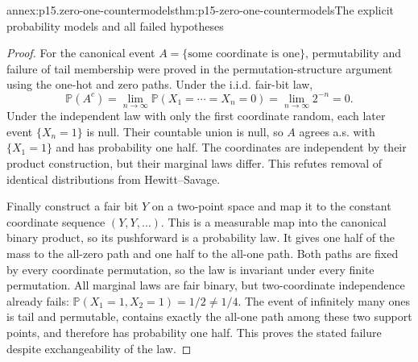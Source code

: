 \begin{annexitem}{annex:p15.zero-one-countermodels}{thm:p15-zero-one-countermodels}{The explicit probability models and all failed hypotheses}
\begin{proof}
For the canonical event \(A=\{\text{some coordinate is one}\}\),
permutability and failure of tail membership were proved in
the permutation-structure argument using the one-hot and zero
paths. Under the i.i.d. fair-bit law,
\[
 \mathbb P(A^c)=\lim_{n\to\infty}
      \mathbb P(X_1=\cdots=X_n=0)=\lim_{n\to\infty}2^{-n}=0.
\]
Under the independent law with only the first coordinate random,
each later event \(\{X_n=1\}\) is null. Their countable
union is null, so \(A\) agrees a.s. with \(\{X_1=1\}\)
and has probability one half. The coordinates are independent
by their product construction, but their marginal laws differ.
This refutes removal of identical distributions from Hewitt--Savage.

Finally construct a fair bit \(Y\) on a two-point space and
map it to the constant coordinate sequence \((Y,Y,\ldots)\).
This is a measurable map into the canonical binary product,
so its pushforward is a probability law. It gives one half
of the mass to the all-zero path and one half to the all-one
path. Both paths are fixed by every coordinate permutation,
so the law is invariant under every finite permutation. All
marginal laws are fair binary, but two-coordinate independence
already fails: \(\mathbb P(X_1=1,X_2=1)=1/2\ne1/4\).
The event of infinitely many ones is tail and permutable,
contains exactly the all-one path among these two support
points, and therefore has probability one half. This proves
the stated failure despite exchangeability of the law.
\end{proof}
\end{annexitem}
